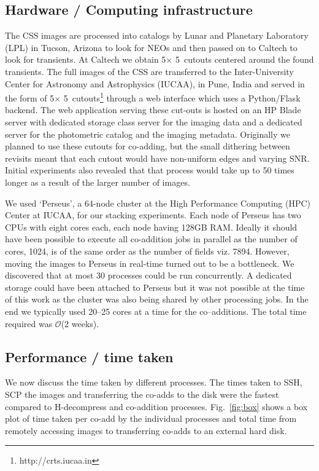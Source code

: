\documentclass[fleqn,usenatbib]{mnras}
\begin{document}
\subsection{Hardware / Computing infrastructure}\label{subsec:hardware}

The CSS images are processed into catalogs by Lunar and Planetary Laboratory (LPL)  in Tucson, Arizona to look for NEOs and then passed on to Caltech to look for transients. At Caltech we obtain 5\arcmin $\times$ 5\arcmin\ cutouts centered around the found transients. The full images of the CSS are transferred to the Inter-University Center for Astronomy and Astrophysics (IUCAA), in Pune, India and served in the form of 5\arcmin $\times$ 5\arcmin\  cutouts\footnote{http://crts.iucaa.in}  through a web interface which uses a Python/Flask backend. The web application serving these cut-outs is hosted on an HP Blade server with dedicated storage class server for the imaging data and a dedicated server for the photometric catalog and the imaging metadata. Originally we planned to use these cutouts for co-adding, but the small dithering between revisits meant that each cutout would have non-uniform edges and varying SNR.  Initial experiments also revealed that that process would take up to 50 times longer as a result of the larger number of images.


We used `Perseus', a 64-node cluster at the High Performance Computing (HPC) Center at IUCAA, for our stacking experiments. Each node of Perseus has two CPUs with eight cores each, each node having 128GB RAM. Ideally it should have been possible to execute all co-addition jobs in parallel as the number of cores, 1024, is of the same order as the number of fields viz. 7894. However, moving the images to Perseus in real-time turned out to be a bottleneck. We discovered that at most 30 processes could be run concurrently. A dedicated storage could have been attached to Perseus but it was not possible at the time of this work as the cluster was also being shared by other processing jobs. In the end we typically used 20--25 cores at a time for the co--additions. The total time required was $\mathcal{O}$(2 weeks).

\subsection{Performance / time taken}\label{subsec:performance}

We now discuss the time taken by different processes. The times taken to SSH, SCP the images and transferring the co-adds to the disk were the fastest compared to H-decompress and co-addition processes. Fig.~\ref{fig:box} shows a box plot of time taken per co-add by the individual processes and total time from remotely accessing images to transferring co-adds to an external hard disk.
\end{document}

